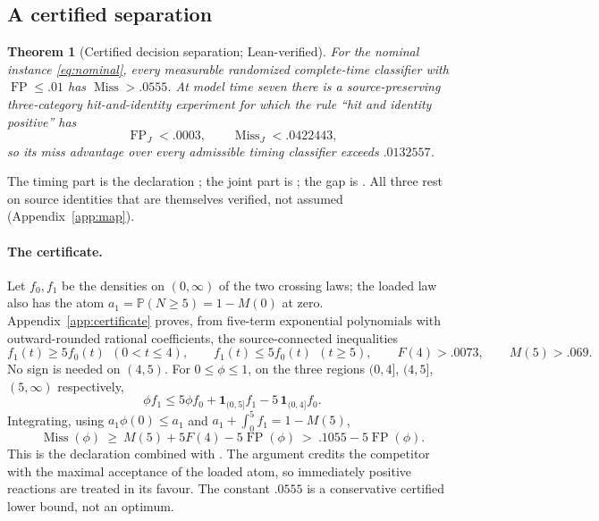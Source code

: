 \documentclass[11pt,a4paper]{article}
\theoremstyle{plain}
\newtheorem{theorem}{Theorem}[section]
\theoremstyle{definition}
\theoremstyle{remark}
\newcommand{\Prob}{\mathbb P}
\newcommand{\FP}{\operatorname{FP}}
\newcommand{\Miss}{\operatorname{Miss}}
\newcommand{\one}{\mathbf 1}
\begin{document}
\subsection{A certified separation}
\begin{theorem}[Certified decision separation; Lean-verified]\label{thm:separation}
For the nominal instance \eqref{eq:nominal}, every measurable randomized complete-time classifier with $\FP\le.01$ has $\Miss>.0555$. At model time seven there is a source-preserving three-category hit-and-identity experiment for which the rule ``hit and identity positive'' has
\begin{equation}\label{eq:joint}
\FP_J<.0003,\qquad\Miss_J<.0422443,
\end{equation}
so its miss advantage over every admissible timing classifier exceeds $.0132557$.
\end{theorem}
The timing part is the declaration ; the joint part is ; the gap is . All three rest on source identities that are themselves verified, not assumed (Appendix~\ref{app:map}).

\paragraph{The certificate.}
Let $f_0,f_1$ be the densities on $(0,\infty)$ of the two crossing laws; the loaded law also has the atom $a_1=\Prob(N\ge5)=1-M(0)$ at zero. Appendix~\ref{app:certificate} proves, from five-term exponential polynomials with outward-rounded rational coefficients, the source-connected inequalities
\begin{equation}\label{eq:signs}
f_1(t)\ge5f_0(t)\ \ (0<t\le4),\qquad f_1(t)\le5f_0(t)\ \ (t\ge5),\qquad F(4)>.0073,\qquad M(5)>.069.
\end{equation}
No sign is needed on $(4,5)$. For $0\le\phi\le1$, on the three regions $(0,4]$, $(4,5]$, $(5,\infty)$ respectively,
\[
\phi f_1\le5\phi f_0+\one_{(0,5]}f_1-5\,\one_{(0,4]}f_0 .
\]
Integrating, using $a_1\phi(0)\le a_1$ and $a_1+\int_0^5f_1=1-M(5)$,
\begin{equation}\label{eq:dual}
\Miss(\phi)\ \ge\ M(5)+5F(4)-5\FP(\phi)\ >\ .1055-5\FP(\phi).
\end{equation}
This is the declaration  combined with . The argument credits the competitor with the maximal acceptance of the loaded atom, so immediately positive reactions are treated in its favour. The constant $.0555$ is a conservative certified lower bound, not an optimum.
\end{document}

